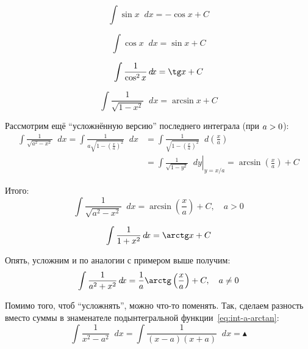 \documentclass[a4paper,12pt]{article}
\newcommand{\diff}{\mathop{}\!d\!}
\begin{document}
  \begin{equation}
    \int \sin x \diff x = {-}\cos x + C
  \end{equation}
  
  \begin{equation}
    \int \cos x \diff x = \sin x + C
  \end{equation}
  
  \begin{equation}
    \int \frac{1}{\cos^2 x} \diff x = \tg x + C
  \end{equation}
  
  \begin{equation}
    \int \frac{1}{\sqrt{1 - x^2}} \diff x = \arcsin x + C
  \end{equation}
  
  Рассмотрим ещё ``усложнённую версию'' последнего интеграла (при $a \hm> 0$):
  \begin{equation*}
  \begin{split}
    \int \frac{1}{\sqrt{a^2 - x^2}} \diff x
      = \int \frac{1}{a \sqrt{1 - \left(\frac{x}{a}\right)^2}} \diff x
      &= \int \frac{1}{\sqrt{1 - \left(\frac{x}{a}\right)^2}} \diff \left(\frac{x}{a}\right)\\
      &= \left.\int \frac{1}{\sqrt{1 - y^2}} \diff y \right|_{y = x/a}
      = \arcsin{\left(\frac{x}{a}\right)} + C
  \end{split}
  \end{equation*}
  
  Итого:  
  \begin{equation}\label{eq:int-a-arcsin}
    \int \frac{1}{\sqrt{a^2 - x^2}} \diff x = \arcsin{\left(\frac{x}{a}\right)} + C,\quad a > 0
  \end{equation}
  
  \begin{equation}
    \int \frac{1}{1 + x^2} \diff x = \arctg x + C
  \end{equation}
  
  Опять, усложним и по аналогии с примером выше получим:
  \begin{equation}\label{eq:int-a-arctan}
    \int \frac{1}{a^2 + x^2} \diff x = \frac{1}{a} \arctg\left(\frac{x}{a}\right) + C,\quad a \not= 0
  \end{equation}
  
  Помимо того, чтоб ``усложнять'', можно что-то поменять.
  Так, сделаем разность вместо суммы в знаменателе подынтегральной функции~\eqref{eq:int-a-arctan}:
  \[
    \int \frac{1}{x^2 - a^2} \diff x = \int \frac{1}{(x - a) (x + a)} \diff x = \blacktriangle
  \]
  
\end{document}

